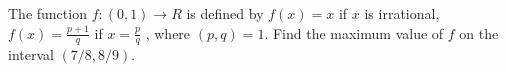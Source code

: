 The function $f : (0,1) \to  R$ is defined by
$f(x) = x$ if $x$ is irrational,
$f(x) = \frac{p+1}{q}$ if $x =\frac{p}{q}$ , where $(p,q) = 1$.
Find the maximum value of $f$ on the interval $(7/8,8/9)$.